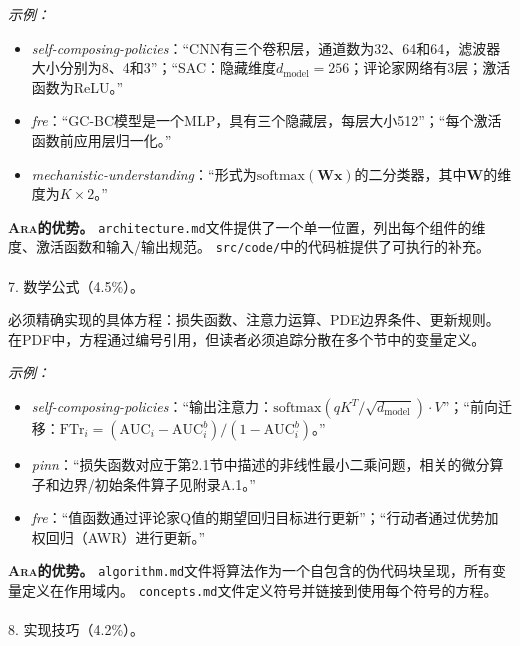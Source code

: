 \documentclass[
]{article}
\makeatletter
\let\oldparagraph\paragraph
\renewcommand{\paragraph}{
    \@ifstar
      \xxxParagraphStar
      \xxxParagraphNoStar
  }
\newcommand{\xxxParagraphStar}[1]{\oldparagraph*{#1}\mbox{}}
\newcommand{\xxxParagraphNoStar}[1]{\oldparagraph{#1}\mbox{}}
\newcommand{\passthrough}[1]{#1}
\providecommand{\tightlist}{%
  \setlength{\itemsep}{0pt}\setlength{\parskip}{0pt}}
\theoremstyle{definition}
\newcommand{\ara}{\textsc{Ara}}
\makeatother
\begin{document}
\emph{示例：}

\begin{itemize}
\tightlist
\item
  \emph{self-composing-policies}：``CNN有三个卷积层，通道数为32、64和64，滤波器大小分别为8、4和3''；``SAC：隐藏维度\(d_{\text{model}} = 256\)；评论家网络有3层；激活函数为ReLU。''
\item
  \emph{fre}：``GC-BC模型是一个MLP，具有三个隐藏层，每层大小512''；``每个激活函数前应用层归一化。''
\item
  \emph{mechanistic-understanding}：``形式为\(\text{softmax}(\mathbf{Wx})\)的二分类器，其中\(\mathbf{W}\)的维度为\(K \times 2\)。''
\end{itemize}

\textbf{\ara{}的优势。}
\passthrough{\lstinline!architecture.md!}文件提供了一个单一位置，列出每个组件的维度、激活函数和输入/输出规范。
\passthrough{\lstinline!src/code/!}中的代码桩提供了可执行的补充。

\paragraph{7. 数学公式（4.5\%）。}\label{ux6570ux5b66ux516cux5f0f4.5}

必须精确实现的具体方程：损失函数、注意力运算、PDE边界条件、更新规则。
在PDF中，方程通过编号引用，但读者必须追踪分散在多个节中的变量定义。

\emph{示例：}

\begin{itemize}
\tightlist
\item
  \emph{self-composing-policies}：``输出注意力：\(\text{softmax}(qK^T / \sqrt{d_{\text{model}}}) \cdot V\)''；``前向迁移：\(\text{FTr}_i = (\text{AUC}_i - \text{AUC}_i^b) / (1 - \text{AUC}_i^b)\)。''
\item
  \emph{pinn}：``损失函数对应于第2.1节中描述的非线性最小二乘问题，相关的微分算子和边界/初始条件算子见附录A.1。''
\item
  \emph{fre}：``值函数通过评论家Q值的期望回归目标进行更新''；``行动者通过优势加权回归（AWR）进行更新。''
\end{itemize}

\textbf{\ara{}的优势。}
\passthrough{\lstinline!algorithm.md!}文件将算法作为一个自包含的伪代码块呈现，所有变量定义在作用域内。
\passthrough{\lstinline!concepts.md!}文件定义符号并链接到使用每个符号的方程。

\paragraph{8. 实现技巧（4.2\%）。}\label{ux5b9eux73b0ux6280ux5de74.2}
\end{document}
